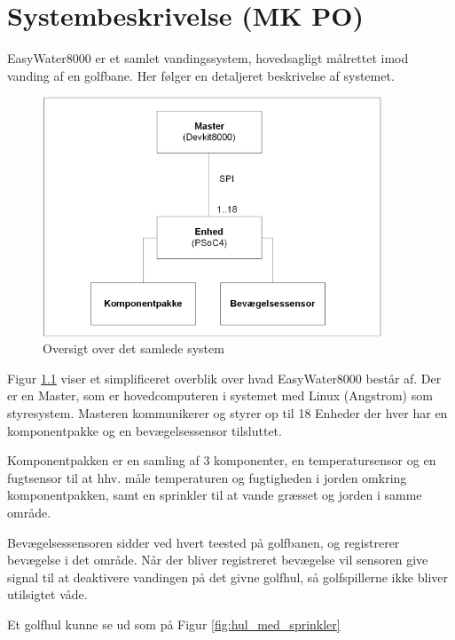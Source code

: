 \chapter{Systembeskrivelse (MK PO)}

EasyWater8000 er et samlet vandingssystem, hovedsagligt målrettet imod vanding af en golfbane. Her følger en detaljeret beskrivelse af systemet.

\begin{figure}[H]
  \centering
    \includegraphics[width=0.9\textwidth]{billeder/systembeskrivelse}
    \caption{Oversigt over det samlede system}
    \label{fig:systembeskrivelse}
\end{figure}

Figur \ref{fig:systembeskrivelse} viser et simplificeret overblik over hvad EasyWater8000 består af. Der er en Master, som er hovedcomputeren i systemet med Linux (Angstrom) som styresystem. Masteren kommunikerer og styrer op til 18 Enheder der hver har en komponentpakke og en bevægelsessensor tilsluttet.

Komponentpakken er en samling af 3 komponenter, en temperatursensor og en fugtsensor til at hhv. måle temperaturen og fugtigheden i jorden omkring komponentpakken, samt en sprinkler til at vande græsset og jorden i samme område.

Bevægelsessensoren sidder ved hvert teested på golfbanen, og registrerer bevægelse i det område. Når der bliver registreret bevægelse vil sensoren give signal til at deaktivere vandingen på det givne golfhul, så golfspillerne ikke bliver utilsigtet våde.

\newpage

Et golfhul kunne se ud som på Figur \ref{fig:hul_med_sprinkler}

